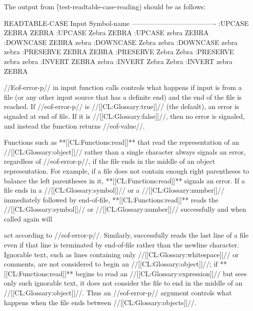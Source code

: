 The output from \f{(test-readtable-case-reading)} should be as follows:

\code
 READTABLE-CASE     Input Symbol-name
 -------------------------------------
    :UPCASE         ZEBRA   ZEBRA
    :UPCASE         Zebra   ZEBRA
    :UPCASE         zebra   ZEBRA
    :DOWNCASE       ZEBRA   zebra
    :DOWNCASE       Zebra   zebra
    :DOWNCASE       zebra   zebra
    :PRESERVE       ZEBRA   ZEBRA
    :PRESERVE       Zebra   Zebra
    :PRESERVE       zebra   zebra
    :INVERT         ZEBRA   zebra
    :INVERT         Zebra   Zebra
    :INVERT         zebra   ZEBRA
\endcode

\endsubsubsection%

\endsubsection%





//Eof-error-p// in input function calls
controls what happens if input is from a file (or any other
input source that has a definite end) and the end of the file is reached.
If //eof-error-p// is //[[CL:Glossary:true]]// (the default), 
an error  is signaled
at end of file.  If it is //[[CL:Glossary:false]]//, then no error is signaled, and instead
the function returns //eof-value//.

Functions such as **[[CL:Functions:read]]** that read the representation
of an //[[CL:Glossary:object]]// rather than a single
character always signals an error, regardless of //eof-error-p//, if
the file ends in the middle of an object representation.
For example, if a file does
not contain enough right parentheses to balance the left parentheses in
it, **[[CL:Functions:read]]** signals an error.  If a file ends in a 
//[[CL:Glossary:symbol]]// or a //[[CL:Glossary:number]]//
immediately followed by end-of-file, **[[CL:Functions:read]]** reads the 
//[[CL:Glossary:symbol]]// or
//[[CL:Glossary:number]]// 
successfully and when called again will



act according to //eof-error-p//.
Similarly, 
successfully reads the last line of a file even if that line
is terminated by end-of-file rather than the newline character.
Ignorable text, such as lines containing only //[[CL:Glossary:whitespace]]// or comments,
are not considered to begin an //[[CL:Glossary:object]]//; 
if **[[CL:Functions:read]]** begins to read an //[[CL:Glossary:expression]]// but sees only such
ignorable text, it does not consider the file to end in the middle of an //[[CL:Glossary:object]]//.
Thus an //eof-error-p// argument controls what happens
when the file ends between //[[CL:Glossary:objects]]//.

